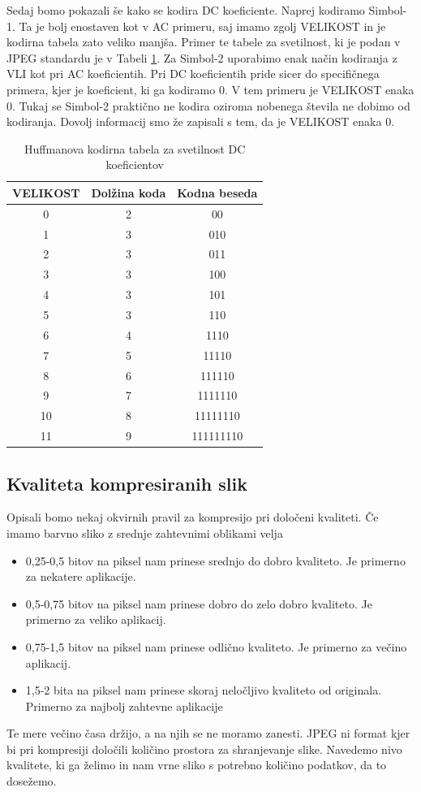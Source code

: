 \documentclass[a4paper,12pt,openright]{book}
\begin{document}
Sedaj bomo pokazali še kako se kodira DC koeficiente. Naprej kodiramo Simbol-1. Ta je bolj enostaven kot v AC primeru, saj imamo zgolj VELIKOST in je kodirna tabela zato veliko manjša. Primer te tabele za svetilnost, ki je podan v JPEG standardu je v Tabeli \ref{tab:Huffman_DC_luminance}. Za Simbol-2 uporabimo enak način kodiranja z VLI kot pri AC koeficientih. Pri DC koeficientih pride sicer do specifičnega primera, kjer je koeficient, ki ga kodiramo 0. V tem primeru je VELIKOST enaka 0. Tukaj se Simbol-2 praktično ne kodira oziroma nobenega števila ne dobimo od kodiranja. Dovolj informacij smo že zapisali s tem, da je VELIKOST enaka 0. 

\begin{table}[ht]
\centering
\begin{tabular}{|c|c|c|}
\hline
VELIKOST&Dolžina koda&Kodna beseda\\
\hline
0& 2& 00\\
1& 3& 010\\
2& 3& 011\\
3& 3& 100\\
4& 3& 101\\
5& 3& 110\\
6& 4& 1110\\
7& 5& 11110\\
8& 6& 111110\\
9& 7& 1111110\\
10& 8& 11111110\\
11& 9& 111111110\\
\hline
\end{tabular}
\caption{Huffmanova kodirna tabela za svetilnost DC koeficientov}
\label{tab:Huffman_DC_luminance}
\end{table}

\subsection{Kvaliteta kompresiranih slik}
Opisali bomo nekaj okvirnih pravil za kompresijo pri določeni kvaliteti. Če imamo barvno sliko z srednje zahtevnimi oblikami velja
\begin{itemize}
   \item 0,25-0,5 bitov na piksel nam prinese srednjo do dobro kvaliteto. Je primerno za nekatere aplikacije.
   \item 0,5-0,75 bitov na piksel nam prinese dobro do zelo dobro kvaliteto. Je primerno za veliko aplikacij.
   \item 0,75-1,5 bitov na piksel nam prinese odlično kvaliteto. Je primerno za večino aplikacij.
   \item 1,5-2 bita na piksel nam prinese skoraj neločljivo kvaliteto od originala. Primerno za najbolj zahtevne aplikacije
\end{itemize}
Te mere večino časa držijo, a na njih se ne moramo zanesti. JPEG ni format kjer bi pri kompresiji določili količino prostora za shranjevanje slike. Navedemo nivo kvalitete, ki ga želimo in nam vrne sliko s potrebno količino podatkov, da to dosežemo.
\end{document}
